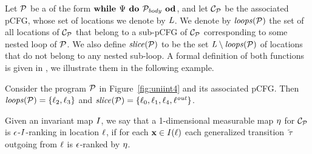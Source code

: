 Let $\mathcal{P}$ be a \PP{} of the form $\textbf{while } \Psi \textbf{ do } 
\mathcal{P}_{\mathit{body}} \textbf{ od}$, and let $\mathcal{C}_{\mathcal{P}}$ be the associated pCFG, whose set of locations we denote by $\mathit{L}$. We denote by $\mathit{loops}(\mathcal{P})$ the set of all locations of $\mathcal{C}_{\mathcal{P}}$ that belong to a sub-pCFG of $\mathcal{C}_{\mathcal{P}}$ corresponding to some nested loop of $\mathcal{P}$. We also define $\mathit{slice}(\mathcal{P})$ to be the set $\mathit{L}\setminus\mathit{loops}(\mathcal{P})$ of locations that do not belong to any nested sub-loop.  A formal definition of 
both functions is given in \AppendixMaterial, we illustrate them in the 
following example.

\begin{example}
Consider the program $\mathcal{P}$ in Figure~\ref{fig:uniint4} and its associated 
pCFG. Then $\mathit{loops}(\mathcal{P})=\{\ell_2,\ell_3\}$ and 
$\mathit{slice}(\mathcal{P})=\{\ell_0,\ell_1,\ell_4,\ell^{\mathit{out}}\}$.
\end{example}

Given an invariant map $I$, we say that a 1-dimensional measurable map 
$\eta$ for $\mathcal{C}_{\mathcal{P}}$ is $\epsilon$-$I$-ranking in location $\ell$, if 
for each $\mathbf{x}\in I(\ell)$  each generalized transition~$\tilde{\tau}$ 
outgoing from $\ell$ is $\epsilon$-ranked by $\eta$. 

